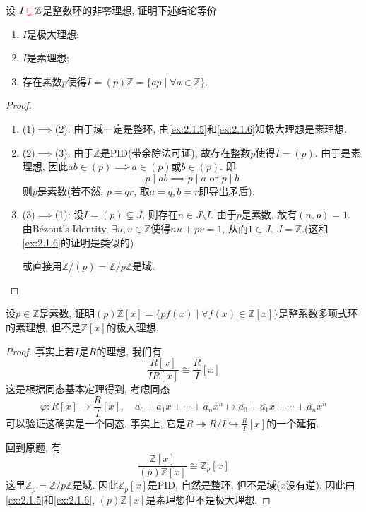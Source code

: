 \begin{problem}
    设 $I \,\textcolor{red}{\subsetneq}\, \mathbb{Z}$是整数环的非零理想, 证明下述结论等价
    \begin{enumerate}[(1)]
        \item $I$是极大理想;
        \item $I$是素理想;
        \item 存在素数$p$使得$I = (p)\mathbb{Z} = \{ap \mid \forall a \in \mathbb{Z}\}$.
    \end{enumerate}
\end{problem}

\begin{proof}
    \begin{enumerate}[1.]
        \item (1)$\implies$(2): 由于域一定是整环, 由\ref{ex:2.1.5}和\ref{ex:2.1.6}知极大理想是素理想.
        \item (2)$\implies$(3): 由于$\mathbb{Z}$是PID(带余除法可证), 故存在整数$p$使得$I = (p)$. 由于是素理想, 因此$ab \in (p) \implies a \in (p)$或$b \in (p)$. 即
        \[
            p \mid ab \implies p \mid a \text{ or } p \mid b
        \]
        则$p$是素数(若不然, $p = qr$, 取$a = q, b = r$即导出矛盾).
        \item (3)$\implies$(1): 设$I = (p) \subsetneq J$, 则存在$n \in J \setminus I$. 由于$p$是素数, 故有$(n, p) = 1$. 由Bézout's Identity, $\exists u, v \in \mathbb{Z}$使得$nu + pv = 1$, 从而$1 \in J,\, J = \mathbb{Z}$.(这和\ref{ex:2.1.6}的证明是类似的)
        
        或直接用$\mathbb{Z}/(p) = \mathbb{Z}/p\mathbb{Z}$是域.
    \end{enumerate}
\end{proof}

\begin{problem}\label{ex:2.1.8}
    设$p \in \mathbb{Z}$是素数, 证明$(p)\mathbb{Z}[x] = \{pf(x) \mid \forall f(x) \in \mathbb{Z}[x]\}$是整系数多项式环的素理想, 但不是$\mathbb{Z}[x]$的极大理想.
\end{problem}

\begin{proof}
    事实上若$I$是$R$的理想, 我们有
    \[
        \frac{R[x]}{IR[x]} \cong \frac{R}{I}[x]
    \]
    这是根据同态基本定理得到, 考虑同态
    \[
        \varphi: R[x] \to \frac{R}{I}[x],\quad a_0 + a_1x + \cdots + a_nx^n \mapsto \overline{a_0} + \overline{a_1}x + \cdots + \overline{a_n}x^n
    \]
    可以验证这确实是一个同态. 事实上, 它是$R \twoheadrightarrow R/I \hookrightarrow \frac{R}{I}[x]$的一个延拓.
    
    回到原题, 有
    \[
        \frac{\mathbb{Z}[x]}{(p)\mathbb{Z}[x]} \cong \mathbb{Z}_p[x]
    \]
    这里$\mathbb{Z}_p = \mathbb{Z}/p\mathbb{Z}$是域. 因此$\mathbb{Z}_p[x]$是PID, 自然是整环, 但不是域($x$没有逆). 因此由\ref{ex:2.1.5}和\ref{ex:2.1.6}, $(p)\mathbb{Z}[x]$是素理想但不是极大理想.
\end{proof}

